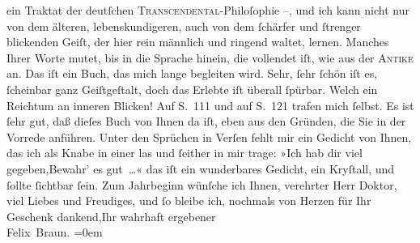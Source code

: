 \begin{ledgroupsized}[t]{13cm}
               ein Traktat der deutſchen \textsc{Transcendental}-Philoſophie –, und
               ich kann nicht \introOben{}nur\introOben{} von dem älteren, lebenskundigeren, auch
               von dem ſchärfer und ſtrenger blickenden Geiſt, der hier rein männlich und ringend
               waltet, lernen. Manches Ihrer Worte mutet, bis in die Sprache hinein, die vollendet
               iſt, wie aus der \textsc{Antike} an.\pend
           \pstart
           Das iſt ein Buch, das mich
               lange begleiten wird. Sehr, ſehr ſchön iſt es, ſcheinbar ganz Geiſtgeſtalt, doch das
               Erlebte iſt überall ſpürbar. {\pb}Welch ein
               Reichtum an inneren Blicken! Auf S. 111 \label{K_L02494_1v}\label{K_L02494_1h} und auf
               S. 121 \label{K_L02494_2v}\label{K_L02494_2h} trafen mich ſelbst.\pend
           \pstart
           Es ist ſehr gut, daß dieſes Buch von Ihnen da iſt, eben aus den Gründen, die Sie in
               der Vorrede anführen. Unter den Sprüchen in Verſen fehlt mir ein Gedicht von Ihnen,
               das ich als Knabe in einer \label{K_L02494_3v}\label{K_L02494_3h} las und ſeither in mir trage:\pend
           \stanza{}»Ich hab dir viel gegeben,\newverse{}Bewahr’ es gut {\dots}«\stanzaend{}\pstart
           das iſt ein wunderbares Gedicht, ein Kryſtall, und ſollte ſichtbar ſein.\pend
           \pstart
           Zum Jahrbeginn wünſche ich Ihnen, verehrter Herr Doktor, viel Liebes und
               Freudiges, und ſo bleibe {\pb}ich, nochmals
               von Herzen für Ihr Geschenk dankend,\hspace*{1.5em}Ihr wahrhaft ergebener{\\[\baselineskip]}\spacefill\mbox{Felix Braun.}\pend
           \leftskip=0em{}
         

\end{ledgroupsized}
